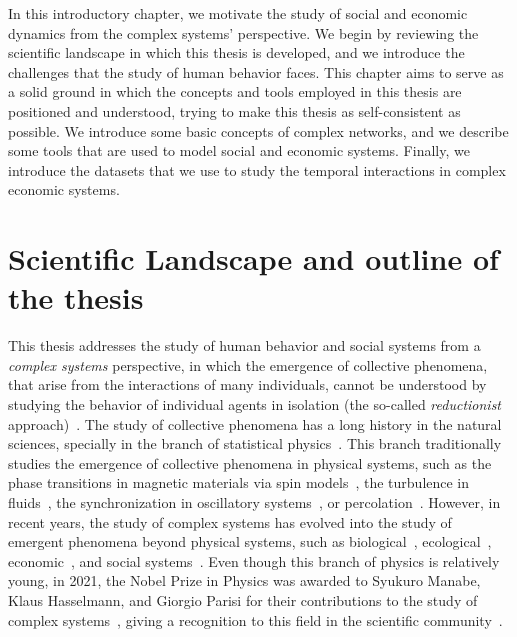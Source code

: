 In this introductory chapter, we motivate the study of social and economic dynamics from the complex systems' perspective. We begin by reviewing the scientific landscape in which this thesis is developed, and we introduce the challenges that the study of human behavior faces. This chapter aims to serve as a solid ground in which the concepts and tools employed in this thesis are positioned and understood, trying to make this thesis as self-consistent as possible. We introduce some basic concepts of complex networks, and we describe some tools that are used to model social and economic systems. Finally, we introduce the datasets that we use to study the temporal interactions in complex economic systems.

\section{\label{sec:scie_lands} Scientific Landscape and outline of the thesis}

This thesis addresses the study of human behavior and social systems from a \textit{complex systems} perspective, in which the emergence of collective phenomena, that arise from the interactions of many individuals, cannot be understood by studying the behavior of individual agents in isolation (the so-called \textit{reductionist} approach)~\cite{anderson1972more}. The study of collective phenomena has a long history in the natural sciences, specially in the branch of statistical physics~\cite{stanley1971phase}. This branch traditionally studies the emergence of collective phenomena in physical systems, such as the phase transitions in magnetic materials via spin models~\cite{onsager-1944}, the turbulence in fluids~\cite{frisch1995turbulence}, the synchronization in oscillatory systems~\cite{pikovsky2001universal}, or percolation~\cite{stauffer-1985}. However, in recent years, the study of complex systems has evolved into the study of emergent phenomena beyond physical systems, such as biological~\cite{brown2000scaling,aderem-2005,alon2019introduction}, ecological~\cite{may-2001}, economic~\cite{limburg2002complex}, and social systems~\cite{castellano2009statistical}. Even though this branch of physics is relatively young, in 2021, the Nobel Prize in Physics was awarded to Syukuro Manabe, Klaus Hasselmann, and Giorgio Parisi for their contributions to the study of complex systems~\cite{nobel-2021}, giving a recognition to this field in the scientific community~\cite{bianconi2023complex}.

